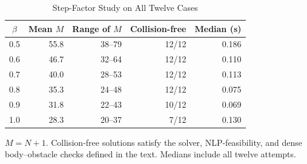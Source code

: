 \begin{table}[t]
\caption{Step-Factor Study on All Twelve Cases}\label{tab:beta}
\centering\footnotesize
\begin{tabular}{@{}crrrr@{}}\toprule
$\beta$&Mean $M$&Range of $M$&Collision-free&Median (s)\\\midrule
0.5&55.8&38--79&12/12&0.186\\
0.6&46.7&32--64&12/12&0.110\\
0.7&40.0&28--53&12/12&0.113\\
0.8&35.3&24--48&12/12&0.075\\
0.9&31.8&22--43&10/12&0.069\\
1.0&28.3&20--37&7/12&0.130\\
\bottomrule\end{tabular}
\par\par\smallskip\parbox{\columnwidth}{\footnotesize $M=N+1$. Collision-free solutions satisfy the solver, NLP-feasibility, and dense body--obstacle checks defined in the text. Medians include all twelve attempts.}
\end{table}